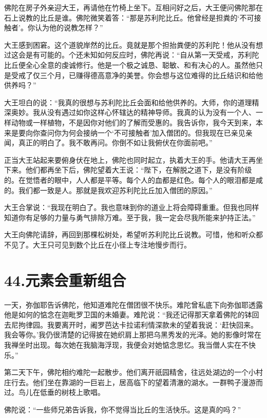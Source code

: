 \documentclass[12pt,twoside,openany]{book}
\begin{document}
佛陀在房子外亲迎大王，再请他在竹椅上坐下。互相问好之后，大王便问佛陀那在石上说教的比丘是谁。佛陀微笑着答：“那是苏利陀比丘。他曾经是担粪的‘不可接触者’。你认为他的说教怎样？”

大王感到困窘。这个道貌岸然的比丘。竟就是那个担抬粪便的苏利陀！他从没有想过这会是有可能的。个还未知如何反应时，佛陀再说：“自从第一天受戒，苏利陀比丘便全心全意的虔诚修行。他是一个极之诚恳、聪敏、和有决心的人。虽然他只是受戒了仅三个月，已赚得德高意净的美誉。你会想与这位难得的比丘结识和给他供养吗？”

大王坦白的说：“我真的很想与苏利陀比丘会面和给他供养的。大师，你的道理精深奥妙。我从没有遇过如你这样心怀辖达的精神导师。我真的认为没有一个人、一样动物或一样植物，不是因你对他们的了解而受惠的。我告诉你，我今天到来，本来是要向你查问你为何会接纳一个‘不可接触者’加入僧团的。但我现在已亲见亲闻，真正的明白了。我不敢再问。你倒不如让我俯伏在你面前吧。”

正当大王站起来要俯身伏在地上，佛陀也同时起立，执着大王的手。他请大王再坐下来。他们都再坐下后，佛陀望着大王说：“陛下，在解脱之道下，是没有阶级的。在觉悟者的眼中，人人都是平等。每个人的血都是红色。每个人的眼泪都是咸的。我们都一致是人。那就是我欢迎苏利陀比丘加入僧团的原因。”

大王合掌说：“我现在明白了。我也意味到你的道业上将会障碍重重。但我也同样知道你有足够的力量与勇气排除万难。至于我，我一定会尽我所能来护持正法。”

大王向佛陀请辞，再回到那棵松树处，希望听苏利陀比丘说教。可惜，他和听众都不见了。大王只可见到数个比丘在小径上专注地慢步而行。


\chapter{44.元素会重新组合}\label{ch44}

一天，弥伽耶告诉佛陀，他知道难陀在僧团很不快乐。难陀曾私底下向弥伽耶透露他是如何的惦念在迦毗罗卫国的未婚妻。难陀说：“我还记得那天拿着佛陀的钵回去尼拘律园。我要离开时，阇罗芭达卡拉诺利情深款未的望着我说：‘赶快回来。我会等你。’我仍很清楚的记得披在她织肩上那把乌黑秀发的光泽。她的影像时常在我禅坐时出现。每次她在我脑海浮现，我便会对她惦念思忆。我当僧人实在不快乐。”

第二天下午，佛陀相约难陀一起散步。他们离开祇园精舍，往远处湖边的一个小村庄行去。他们坐在靠湖的一巨岩上，居高临下的望着清澈的湖水。一群鸭子漫游而过。鸟儿在低垂的树枝上歌唱。

佛陀说：“一些师兄弟告诉我，你不觉得当比丘的生活快乐。这是真的吗？”
\end{document}
